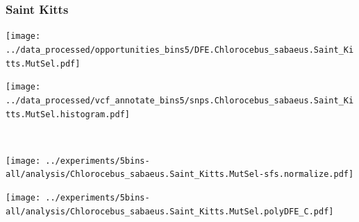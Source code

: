 \subsubsection{Saint Kitts}

\begin{minipage}{0.49\linewidth}
    \texttt{[image: ../data\_processed/opportunities\_bins5/DFE.Chlorocebus\_sabaeus.Saint\_Kitts.MutSel.pdf]}
\end{minipage}
\begin{minipage}{0.49\linewidth}
    \texttt{[image: ../data\_processed/vcf\_annotate\_bins5/snps.Chlorocebus\_sabaeus.Saint\_Kitts.MutSel.histogram.pdf]}
\end{minipage}
\\
\begin{minipage}{0.49\linewidth}
    \texttt{[image: ../experiments/5bins-all/analysis/Chlorocebus\_sabaeus.Saint\_Kitts.MutSel-sfs.normalize.pdf]}
\end{minipage}
\begin{minipage}{0.4\linewidth}
    \texttt{[image: ../experiments/5bins-all/analysis/Chlorocebus\_sabaeus.Saint\_Kitts.MutSel.polyDFE\_C.pdf]}
\end{minipage}
